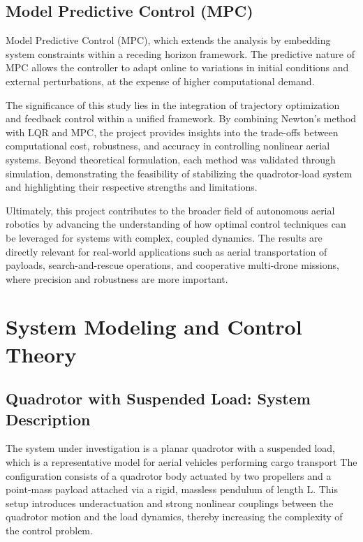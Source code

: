 \documentclass[a4paper,11pt,oneside]{book}
\begin{document}
\section*{Model Predictive Control (MPC)}
\begin{justify}
    Model Predictive Control (MPC), which extends the analysis by embedding system constraints within a receding horizon framework. The predictive nature of MPC allows the controller to adapt online to variations in initial conditions and external perturbations, at the expense of higher computational demand.
\end{justify}


\begin{justify}
    The significance of this study lies in the integration of trajectory optimization and feedback control within a unified framework. By combining Newton’s method with LQR and MPC, the project provides insights into the trade-offs between computational cost, robustness, and accuracy in controlling nonlinear aerial systems. Beyond theoretical formulation, each method was validated through simulation, demonstrating the feasibility of stabilizing the quadrotor-load system and highlighting their respective strengths and limitations.

    Ultimately, this project contributes to the broader field of autonomous aerial robotics by advancing the understanding of how optimal control techniques can be leveraged for systems with complex, coupled dynamics. The results are directly relevant for real-world applications such as aerial transportation of payloads, search-and-rescue operations, and cooperative multi-drone missions, where precision and robustness are more important.
\end{justify}


\chapter{System Modeling and Control Theory}
\label{chap:System_Dynamics}
\section{Quadrotor with Suspended Load: System Description}

\begin{justify}
    The system under investigation is a planar quadrotor with a suspended load, which is a representative model for aerial vehicles performing cargo transport The configuration consists of a quadrotor body actuated by two propellers and a point-mass payload attached via a rigid, massless pendulum of length L. This setup introduces underactuation and strong nonlinear couplings between the quadrotor motion and the load dynamics, thereby increasing the complexity of the control problem.
\end{justify}
\end{document}
